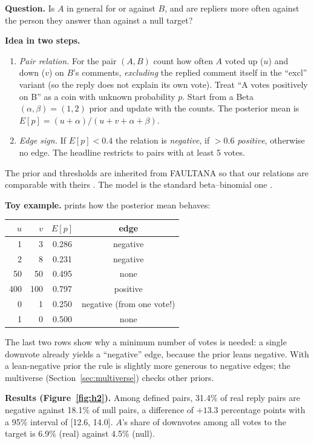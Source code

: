 \textbf{Question.} Is $A$ in general for or against $B$, and are repliers more often against the person they answer than against a null target?

\textbf{Idea in two steps.}
\begin{enumerate}
  \item \emph{Pair relation.} For the pair $(A,B)$ count how often $A$ voted up ($u$) and down ($v$) on $B$'s comments, \emph{excluding} the replied comment itself in the ``excl'' variant (so the reply does not explain its own vote). Treat ``A votes positively on B'' as a coin with unknown probability $p$. Start from a Beta$(\alpha,\beta)=(1,2)$ prior and update with the counts. The posterior mean is $E[p]=(u+\alpha)/(u+v+\alpha+\beta)$.
  \item \emph{Edge sign.} If $E[p]<0.4$ the relation is \emph{negative}, if $>0.6$ \emph{positive}, otherwise no edge. The headline restricts to pairs with at least 5 votes.
\end{enumerate}
The prior and thresholds are inherited from FAULTANA so that our relations are comparable with theirs . The model is the standard beta--binomial one .

\textbf{Toy example.}  prints how the posterior mean behaves:
\begin{center}
\begin{tabular}{@{}rrcc@{}}
\toprule
$u$ & $v$ & $E[p]$ & edge \\
\midrule
1 & 3 & 0.286 & negative \\
2 & 8 & 0.231 & negative \\
50 & 50 & 0.495 & none \\
400 & 100 & 0.797 & positive \\
0 & 1 & 0.250 & negative (from one vote!) \\
1 & 0 & 0.500 & none \\
\bottomrule
\end{tabular}
\end{center}
The last two rows show why a minimum number of votes is needed: a single downvote already yields a ``negative'' edge, because the prior leans negative. With a lean-negative prior the rule is slightly more generous to negative edges; the multiverse (Section~\ref{sec:multiverse}) checks other priors.

\textbf{Results (Figure~\ref{fig:h2}).} Among defined pairs, 31.4\% of real reply pairs are negative against 18.1\% of null pairs, a difference of $+13.3$ percentage points with a 95\% interval of [12.6, 14.0]. $A$'s share of downvotes among all votes to the target is 6.9\% (real) against 4.5\% (null).

